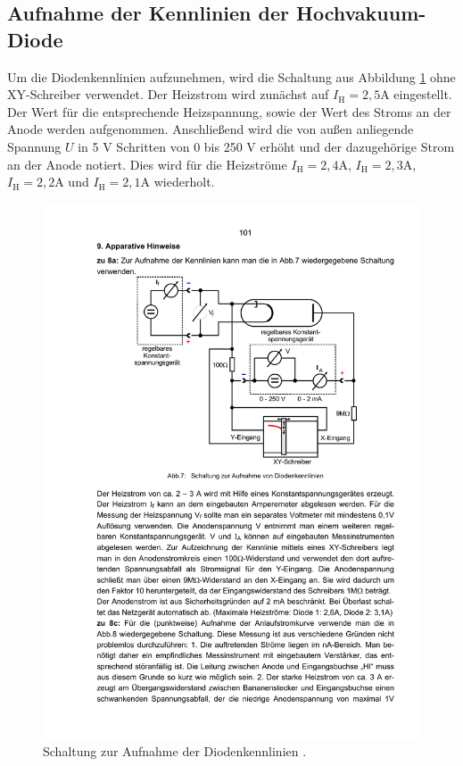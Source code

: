 \subsection{Aufnahme der Kennlinien der Hochvakuum-Diode}

Um die Diodenkennlinien aufzunehmen, wird die Schaltung aus Abbildung \ref{fig:aufbau1} ohne XY-Schreiber verwendet. Der Heizstrom wird zunächst auf   $I_\mathrm{H} = 2,5 \si{\ampere}$ eingestellt. Der Wert für die entsprechende Heizspannung, sowie der Wert des Stroms an der Anode werden aufgenommen. Anschließend wird die von außen anliegende Spannung $U$ in 5 \si{\volt} Schritten von 0 bis 250 \si{\volt} erhöht und der dazugehörige Strom an der Anode notiert. Dies wird für die Heizströme $I_\mathrm{H} = 2,4 \si{\ampere}$, $I_\mathrm{H} = 2,3 \si{\ampere}$, $I_\mathrm{H} = 2,2 \si{\ampere}$ und $I_\mathrm{H} = 2,1 \si{\ampere}$ wiederholt.

\begin{figure}
  \centering
  \includegraphics[scale=0.6]{content/aufbau1.pdf}
\caption{Schaltung zur Aufnahme der Diodenkennlinien \cite{anleitung504}.}
  \label{fig:aufbau1}
\end{figure}

